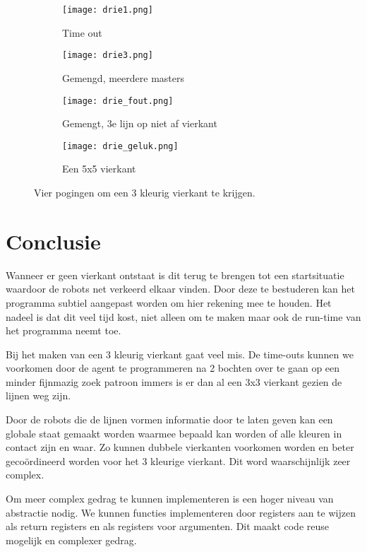 \documentclass[10pt]{article}
\begin{document}
\begin{figure}[h!]
  \centering
  \begin{subfigure}[b]{0.4\linewidth}
    \texttt{[image: drie1.png]}
    \caption{Time out} \label{fig:drie1}
  \end{subfigure}
  \begin{subfigure}[b]{0.4\linewidth}
    \texttt{[image: drie3.png]}
    \caption{Gemengd, meerdere masters} \label{fig:drie3}
  \end{subfigure}
  \begin{subfigure}[b]{0.4\linewidth}
    \texttt{[image: drie\_fout.png]}
    \caption{Gemengt, 3e lijn op niet af vierkant} \label{fig:drie_fout}
  \end{subfigure}
    \begin{subfigure}[b]{0.4\linewidth}
    \texttt{[image: drie\_geluk.png]}
    \caption{Een 5x5 vierkant} \label{fig:drie_geluk}
  \end{subfigure}
  \caption{Vier pogingen om een 3 kleurig vierkant te krijgen.}
  \label{fig:coffee}
\end{figure}

\section{Conclusie}
Wanneer er geen vierkant ontstaat is dit terug te brengen tot een startsituatie waardoor de robots net verkeerd elkaar vinden. Door deze te bestuderen kan het programma subtiel aangepast worden om hier rekening mee te houden. Het nadeel is dat dit veel tijd kost, niet alleen om te maken maar ook de run-time van het programma neemt toe.

Bij het maken van een 3 kleurig vierkant gaat veel mis. De time-outs kunnen we voorkomen door de agent te programmeren na 2 bochten over te gaan op een minder fijnmazig zoek patroon immers is er dan al een 3x3 vierkant gezien de lijnen weg zijn. 

Door de robots die de lijnen vormen informatie door te laten geven kan een globale staat gemaakt worden waarmee bepaald kan worden of alle kleuren in contact zijn en waar. Zo kunnen dubbele vierkanten voorkomen worden en beter gecoördineerd worden voor het 3 kleurige vierkant. Dit word waarschijnlijk zeer complex.

Om meer complex gedrag te kunnen implementeren is een hoger niveau van abstractie nodig. We kunnen functies implementeren door registers aan te wijzen als return registers en als registers voor argumenten. Dit maakt code reuse mogelijk en complexer gedrag.
\end{document}
